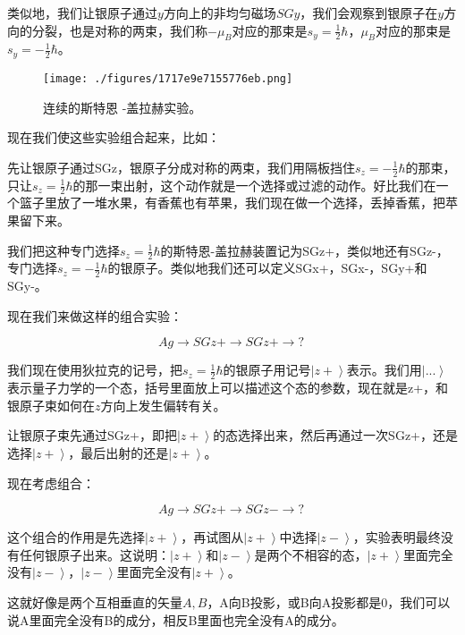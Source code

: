 类似地，我们让银原子通过$y$方向上的非均匀磁场$SGy$，我们会观察到银原子在$y$方向的分裂，也是对称的两束，我们称$- \mu_B$对应的那束是$s_y = \frac{1}{2} \hbar$，$\mu_B$对应的那束是$s_y = - \frac{1}{2} \hbar$。

\begin{figure}[ht]
\centering
\texttt{[image: ./figures/1717e9e7155776eb.png]}
\caption{连续的斯特恩 -盖拉赫实验。} \label{fig_QMPre2_23}
\end{figure}

现在我们使这些实验组合起来，比如：

先让银原子通过SGz，银原子分成对称的两束，我们用隔板挡住$s_z = -\frac{1}{2} \hbar$的那束，只让$s_z = \frac{1}{2} \hbar$的那一束出射，这个动作就是一个选择或过滤的动作。好比我们在一个篮子里放了一堆水果，有香蕉也有苹果，我们现在做一个选择，丢掉香蕉，把苹果留下来。

我们把这种专门选择$s_z = \frac{1}{2}\hbar$的斯特恩-盖拉赫装置记为SGz+，类似地还有SGz-，专门选择$s_z = - \frac{1}{2}\hbar$的银原子。类似地我们还可以定义SGx+，SGx-，SGy+和SGy-。

现在我们来做这样的组合实验：

\begin{equation}
Ag \to SGz+ \to SGz+ \to ?~
\end{equation}

我们现在使用狄拉克的记号，把$s_z = \frac{1}{2}\hbar$的银原子用记号$\left| z+ \right\rangle$表示。我们用$\left| { ... } \right\rangle$表示量子力学的一个态，括号里面放上可以描述这个态的参数，现在就是z+，和银原子束如何在$z$方向上发生偏转有关。

让银原子束先通过SGz+，即把$\left| z+ \right\rangle$的态选择出来，然后再通过一次SGz+，还是选择$\left| z+ \right\rangle$，最后出射的还是$\left| z+ \right\rangle$。

现在考虑组合：

\begin{equation}
Ag \to SGz+ \to SGz- \to ?~
\end{equation}

这个组合的作用是先选择$\left| z+ \right\rangle$，再试图从$\left| z+ \right\rangle$中选择$\left| z- \right\rangle$，实验表明最终没有任何银原子出来。这说明：$\left| z+ \right\rangle$和$\left| z- \right\rangle$是两个不相容的态，$\left| z+ \right\rangle$里面完全没有$\left| z- \right\rangle$，$\left| z- \right\rangle$里面完全没有$\left| z+ \right\rangle$。

这就好像是两个互相垂直的矢量$A, B$，A向B投影，或B向A投影都是0，我们可以说A里面完全没有B的成分，相反B里面也完全没有A的成分。

